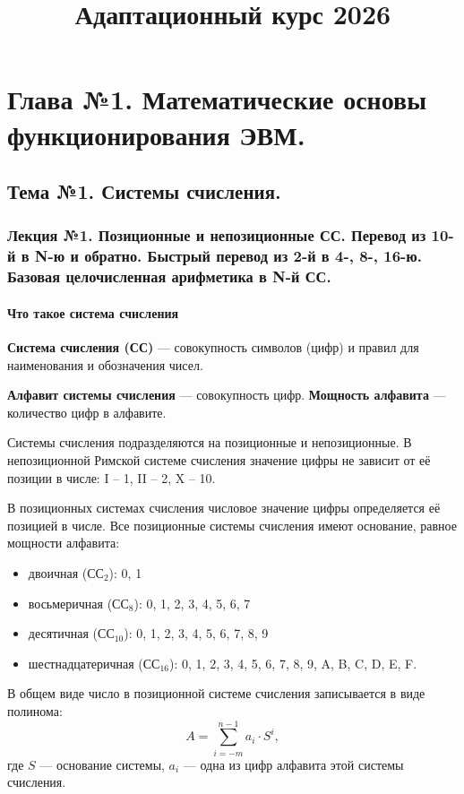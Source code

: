 \documentclass[a4paper,14pt]{report}
\title{Адаптационный курс 2026}
\begin{document}
\maketitle
\tableofcontents

\part{Глава №1. Математические основы функционирования ЭВМ.}

\chapter{Тема №1. Системы счисления.}
\section{Лекция №1. Позиционные и непозиционные СС. Перевод из 10-й в N-ю и обратно. Быстрый перевод из 2-й в 4-, 8-, 16-ю. Базовая целочисленная арифметика в N-й СС.}

\subsection{Что такое система счисления}
\textbf{Система счисления (СС)} --- совокупность символов (цифр) и правил для наименования и обозначения чисел.

\textbf{Алфавит системы счисления} --- совокупность цифр.
\textbf{Мощность алфавита} --- количество цифр в алфавите.

Системы счисления подразделяются на позиционные и непозиционные. В непозиционной Римской системе счисления значение цифры не зависит от её позиции в числе: I -- 1, II -- 2, X -- 10.

В позиционных системах счисления числовое значение цифры определяется её позицией в числе. Все позиционные системы счисления имеют основание, равное мощности алфавита:

\begin{itemize}
    \item двоичная (СС$_{2}$): 0, 1
    \item восьмеричная (СС$_{8}$): 0, 1, 2, 3, 4, 5, 6, 7
    \item десятичная (СС$_{10}$): 0, 1, 2, 3, 4, 5, 6, 7, 8, 9
    \item шестнадцатеричная (СС$_{16}$): 0, 1, 2, 3, 4, 5, 6, 7, 8, 9, A, B, C, D, E, F.
\end{itemize}

В общем виде число в позиционной системе счисления записывается в виде полинома:
\[
A = \sum_{i=-m}^{n-1} a_i \cdot S^i,
\]
где $S$ --- основание системы, $a_i$ --- одна из цифр алфавита этой системы счисления.
\end{document}
